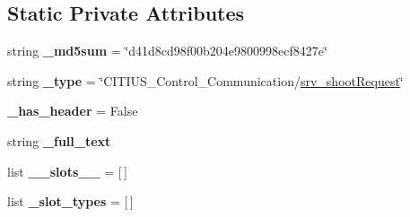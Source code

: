 \subsection*{\-Static \-Private \-Attributes}
\begin{DoxyCompactItemize}
\item 
\hypertarget{class_c_i_t_i_u_s___control___communication_1_1srv_1_1__srv__shoot_1_1srv__shoot_request_a4033ed2a9341743d892b1e01d46d3146}{string {\bfseries \-\_\-md5sum} = \char`\"{}d41d8cd98f00b204e9800998ecf8427e\char`\"{}}\label{class_c_i_t_i_u_s___control___communication_1_1srv_1_1__srv__shoot_1_1srv__shoot_request_a4033ed2a9341743d892b1e01d46d3146}

\item 
\hypertarget{class_c_i_t_i_u_s___control___communication_1_1srv_1_1__srv__shoot_1_1srv__shoot_request_a8bbebea398d78b428033ef40bbb30aee}{string {\bfseries \-\_\-type} = \char`\"{}\-C\-I\-T\-I\-U\-S\-\_\-\-Control\-\_\-\-Communication/\hyperlink{class_c_i_t_i_u_s___control___communication_1_1srv_1_1__srv__shoot_1_1srv__shoot_request}{srv\-\_\-shoot\-Request}\char`\"{}}\label{class_c_i_t_i_u_s___control___communication_1_1srv_1_1__srv__shoot_1_1srv__shoot_request_a8bbebea398d78b428033ef40bbb30aee}

\item 
\hypertarget{class_c_i_t_i_u_s___control___communication_1_1srv_1_1__srv__shoot_1_1srv__shoot_request_aaaf26316d8bef20da1c5fb0d51929fda}{{\bfseries \-\_\-has\-\_\-header} = \-False}\label{class_c_i_t_i_u_s___control___communication_1_1srv_1_1__srv__shoot_1_1srv__shoot_request_aaaf26316d8bef20da1c5fb0d51929fda}

\item 
string {\bfseries \-\_\-full\-\_\-text}
\item 
\hypertarget{class_c_i_t_i_u_s___control___communication_1_1srv_1_1__srv__shoot_1_1srv__shoot_request_a8e2d9667cea44a1224da1f67cc2d7578}{list {\bfseries \-\_\-\-\_\-slots\-\_\-\-\_\-} = \mbox{[}$\,$\mbox{]}}\label{class_c_i_t_i_u_s___control___communication_1_1srv_1_1__srv__shoot_1_1srv__shoot_request_a8e2d9667cea44a1224da1f67cc2d7578}

\item 
\hypertarget{class_c_i_t_i_u_s___control___communication_1_1srv_1_1__srv__shoot_1_1srv__shoot_request_a7ac1989b0c2984c247d0ae7c1d65982b}{list {\bfseries \-\_\-slot\-\_\-types} = \mbox{[}$\,$\mbox{]}}\label{class_c_i_t_i_u_s___control___communication_1_1srv_1_1__srv__shoot_1_1srv__shoot_request_a7ac1989b0c2984c247d0ae7c1d65982b}

\end{DoxyCompactItemize}


